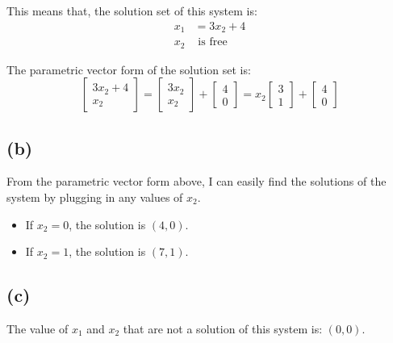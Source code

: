 \documentclass[10pt]{article}
\begin{document}
\noindent This means that, the solution set of this system is:
\begin{align*}
    x_1 &= 3x_2 + 4 \\
    x_2 &\text{ is free}
\end{align*}

\noindent The parametric vector form of the solution set is:
\begin{equation*}
    \begin{bmatrix}
        3x_2 + 4 \\
        x_2
    \end{bmatrix}
    =
    \begin{bmatrix}
        3x_2 \\
        x_2
    \end{bmatrix}
    +
    \begin{bmatrix}
        4 \\
        0
    \end{bmatrix}
    =
    x_2
    \begin{bmatrix}
        3 \\
        1
    \end{bmatrix}
    +
    \begin{bmatrix}
        4 \\
        0
    \end{bmatrix}
\end{equation*}


\subsection*{(b)}
\noindent From the parametric vector form above, I can easily find the solutions of the system by plugging in any values of $x_2$.
\begin{itemize}
    \item If $x_2 = 0$, the solution is $(4, 0)$.
    \item If $x_2 = 1$, the solution is $(7, 1)$.
\end{itemize}



\subsection*{(c)}
\noindent The value of $x_1$ and $x_2$ that are not a solution of this system is: $(0, 0)$.
\end{document}
